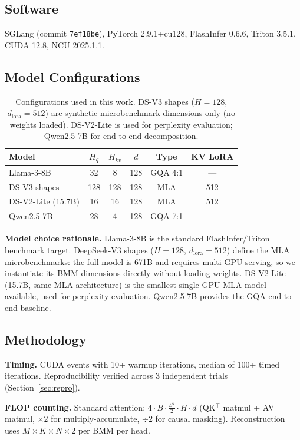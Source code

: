 \documentclass[10pt,twocolumn]{article}
\begin{document}
\subsection{Software}
SGLang (commit \texttt{7ef18be}), PyTorch 2.9.1+cu128, FlashInfer 0.6.6, Triton 3.5.1, CUDA 12.8, NCU 2025.1.1.

\subsection{Model Configurations}

\begin{table}[h]
\centering
\small
\caption{Configurations used in this work.  DS-V3 shapes ($H{=}128$, $d_\text{lora}{=}512$) are synthetic microbenchmark dimensions only (no weights loaded).  DS-V2-Lite is used for perplexity evaluation; Qwen2.5-7B for end-to-end decomposition.}
\label{tab:configs}
\begin{tabular}{@{}lccccc@{}}
\toprule
Model & $H_q$ & $H_{kv}$ & $d$ & Type & KV LoRA \\
\midrule
Llama-3-8B        & 32  & 8   & 128 & GQA 4:1 & ---  \\
DS-V3 shapes      & 128 & 128 & 128 & MLA     & 512  \\
DS-V2-Lite (15.7B) & 16 & 16  & 128 & MLA     & 512  \\
Qwen2.5-7B        & 28  & 4   & 128 & GQA 7:1 & ---  \\
\bottomrule
\end{tabular}
\end{table}

\textbf{Model choice rationale.}  Llama-3-8B is the standard FlashInfer/Triton benchmark target.  DeepSeek-V3 shapes ($H{=}128$, $d_\text{lora}{=}512$) define the MLA microbenchmarks: the full model is 671B and requires multi-GPU serving, so we instantiate its BMM dimensions directly without loading weights.  DS-V2-Lite (15.7B, same MLA architecture) is the smallest single-GPU MLA model available, used for perplexity evaluation.  Qwen2.5-7B provides the GQA end-to-end baseline.

\subsection{Methodology}

\textbf{Timing.}  CUDA events with 10+ warmup iterations, median of 100+ timed iterations.  Reproducibility verified across 3 independent trials (Section~\ref{sec:repro}).

\textbf{FLOP counting.}  Standard attention: $4 \cdot B \cdot \frac{S^2}{2} \cdot H \cdot d$ (QK$^\top$ matmul + AV matmul, $\times 2$ for multiply-accumulate, $\div 2$ for causal masking).  Reconstruction uses $M \times K \times N \times 2$ per BMM per head.
\end{document}
